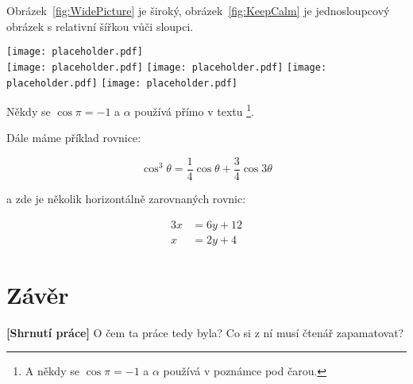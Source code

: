 Obrázek~\ref{fig:WidePicture} je široký, obrázek~\ref{fig:KeepCalm} je jednosloupcový obrázek s relativní šířkou vůči sloupci.
\begin{figure*}[t]\centering %
  \centering
  \texttt{[image: placeholder.pdf]}\\[1pt]
  \texttt{[image: placeholder.pdf]}
  \texttt{[image: placeholder.pdf]}
  \texttt{[image: placeholder.pdf]}
  \texttt{[image: placeholder.pdf]}
  \caption{Široký obrázek. Celý obrázek je složen z několika menších obrázků, pokud chcete adresovat jednotlivé obrázky v popisku nebo z textu, použijte balíček \textit{subcaption}.}
  \label{fig:WidePicture}
\end{figure*}
Někdy se $\cos\pi=-1$ a $\alpha$ používá přímo v textu%
\footnote{A někdy se $\cos\pi=-1$ a $\alpha$ používá v poznámce pod čarou.}.

Dále máme příklad rovnice:
\begin{linenomath}
\begin{equation}
\cos^3 \theta =\frac{1}{4}\cos\theta+\frac{3}{4}\cos 3\theta
\label{eq:refname2}
\end{equation}
\end{linenomath}
a zde je několik horizontálně zarovnaných rovnic:
\begin{linenomath}
\begin{align}
	3x &= 6y + 12 \\
	x &= 2y + 4
\end{align}
\end{linenomath}



\section{Závěr}
\label{sec:Conclusions}

\textbf{[Shrnutí práce]} O čem ta práce tedy byla? Co si z ní musí čtenář zapamatovat?

